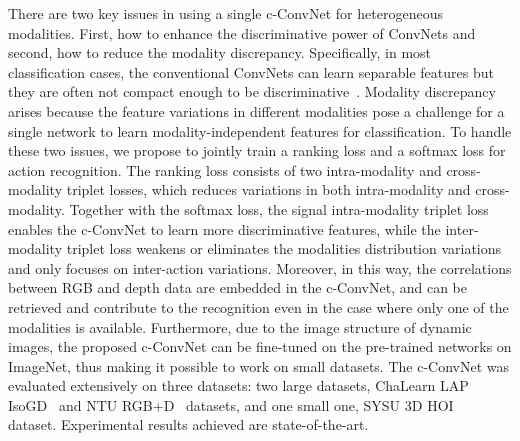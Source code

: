 \documentclass[letterpaper]{article} %
\begin{document}
There are two key issues in using a single c-ConvNet for heterogeneous modalities. First, how to enhance the discriminative power of ConvNets and second, how to reduce the modality discrepancy. Specifically, in most classification cases, the conventional ConvNets can learn separable features but they are often not compact enough to be discriminative~\cite{wen2016discriminative}. Modality discrepancy arises because the feature variations in different modalities pose a challenge for a single network to learn modality-independent features for classification. To handle these two issues, we propose to jointly train a ranking loss  and a softmax loss for action recognition. The ranking loss consists of two intra-modality and cross-modality triplet losses, which reduces variations in both intra-modality and cross-modality. Together with the softmax loss, the signal intra-modality triplet loss enables the c-ConvNet to learn more discriminative features, while the inter-modality triplet loss weakens or eliminates the modalities distribution variations and only focuses on inter-action variations. Moreover, in this way, the correlations between RGB and depth data are embedded in the c-ConvNet, and can be retrieved and contribute to the recognition even in the case where only one of the modalities is available. Furthermore, due to the image structure of dynamic images, the proposed c-ConvNet can be fine-tuned on the pre-trained networks on ImageNet, thus making it possible to work on small datasets. The c-ConvNet was evaluated extensively on three datasets: two large datasets, ChaLearn LAP IsoGD~\cite{wanchalearn} and NTU RGB+D~\cite{shahroudy2016ntu} datasets, and one small one, SYSU 3D HOI~\cite{hu2015jointly} dataset. Experimental results achieved are state-of-the-art.

%
\end{document}
